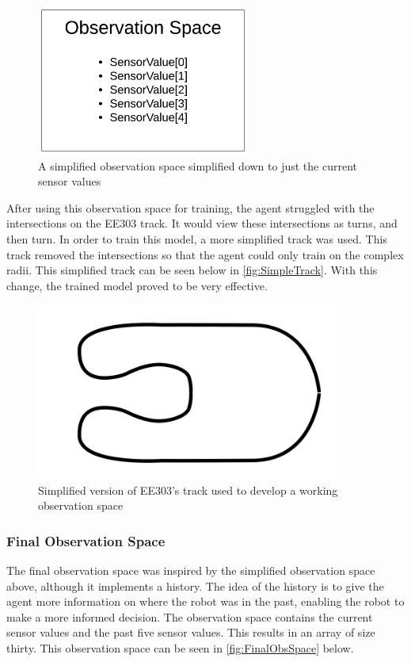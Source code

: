 \documentclass[a4paper,12pt]{article}
\begin{document}
\begin{figure}[H]
\centering
\includegraphics[width=7cm]{imgs/SimpleObsSpace.png}
\caption{A simplified observation space simplified down to just the current sensor values}
\label{fig:SimpleObsSpace}
\end{figure}
\noindent
After using this observation space for training, the agent struggled with the intersections on the EE303 track. It would view these intersections as turns, and then turn. In order to train this model, a more simplified track was used. This track removed the intersections so that the agent could only train on the complex radii. This simplified track can be seen below in \autoref{fig:SimpleTrack}. With this change, the trained model proved to be very effective.

\begin{figure}[H]
\centering
\includegraphics[width=10cm]{imgs/SimpleTrack.png}
\caption{Simplified version of EE303's track used to develop a working observation space \cite{KevinMcGuinness}}
\label{fig:SimpleTrack}
\end{figure}

 
\subsubsection{Final Observation Space}

The final observation space was inspired by the simplified observation space above, although it implements a history. The idea of the history is to give the agent more information on where the robot was in the past, enabling the robot to make a more informed decision. The observation space contains the current sensor values and the past five sensor values. This results in an array of size thirty. This observation space can be seen in \autoref{fig:FinalObsSpace} below.
\end{document}
